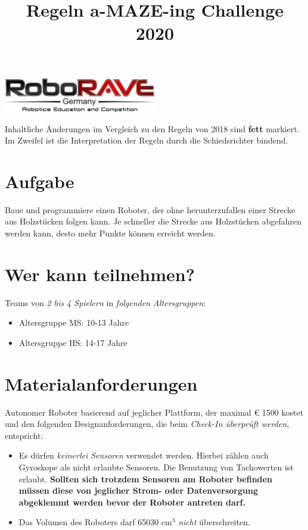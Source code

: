\documentclass[a4paper,12pt]{article}
\begin{document}
\title{Regeln a-MAZE-ing Challenge 2020}

\makeatletter
\let\inserttitle\@title
\makeatother

 \begin{center}
\includegraphics[width=0.5\textwidth]{logo.png}

\huge                      %
\bfseries                   %
\inserttitle
  \end{center}
Inhaltliche Änderungen im Vergleich zu den Regeln von 2018 sind \textbf{fett} markiert. Im Zweifel ist die Interpretation der Regeln durch die Schiedsrichter bindend.


\section{Aufgabe}
Baue und programmiere einen Roboter, der ohne herunterzufallen einer Strecke aus Holzstücken folgen
kann. Je schneller die Strecke aus Holzstücken abgefahren werden kann, desto mehr Punkte können erreicht
werden.

\section{Wer kann teilnehmen?}
Teams von \emph{2 bis 4 Spielern} in \emph{folgenden Altersgruppen}:
\begin{itemize}
	\item Altersgruppe MS: 10-13 Jahre
	\item Altersgruppe HS: 14-17 Jahre
\end{itemize}

\section{Materialanforderungen}
Autonomer Roboter basierend auf jeglicher Plattform, der maximal  \euro{ 1500} kostet und den folgenden
Designanforderungen, die beim \emph{Check-In überprüft werden}, entspricht:
\begin{itemize}
\item Es dürfen \emph{keinerlei Sensoren} verwendet werden. Hierbei zählen auch
Gyroskope als nicht erlaubte Sensoren. Die Benutzung von Tachowerten ist erlaubt.
\textbf{Sollten sich trotzdem Sensoren am Roboter befinden müssen diese von jeglicher Strom- oder
Datenversorgung abgeklemmt werden bevor der Roboter antreten darf.}
\item Das Volumen des Roboters darf 65030 cm$^{3}$ \emph{nicht} überschreiten.
\end{itemize}
\end{document}
